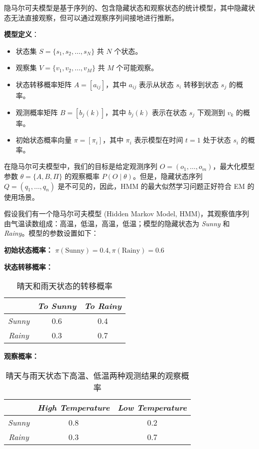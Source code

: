 \documentclass[12pt,a4paper]{article}%
\begin{document}
隐马尔可夫模型是基于序列的、包含隐藏状态和观察状态的统计模型，其中隐藏状态无法直接观察，但可以通过观察序列间接地进行推断。

\textbf{模型定义}：
\begin{itemize}
    \item 状态集 \( S = \{s_1, s_2, \ldots, s_N\} \) 共 \( N \) 个状态。
    \item 观察集 \( V = \{v_1, v_2, \ldots, v_M\} \) 共 \( M \) 个可能观察。
    \item 状态转移概率矩阵 \( A = [a_{ij}] \)，其中 \( a_{ij} \) 表示从状态 \( s_i \) 转移到状态 \( s_j \) 的概率。
    \item 观测概率矩阵 \( B = [b_j(k)] \)，其中 \( b_j(k) \) 表示在状态 \( s_j \) 下观测到 \( v_k \) 的概率。
    \item 初始状态概率向量 \( \pi = [\pi_i] \)，其中 \( \pi_i \) 表示模型在时间 \( t = 1 \) 处于状态 \( s_i \) 的概率。
\end{itemize}

在隐马尔可夫模型中，我们的目标是给定观测序列 \( O = (o_1, \dots, o_m) \)，最大化模型参数 $ \theta = \{A, B, \Pi\} $ 的观察概率 \( P(O \mid \theta) \)。但是，隐藏状态序列 \( Q = (q_1, \dots, q_n) \) 是不可见的，因此，HMM 的最大似然学习问题正好符合 EM 的使用场景。


假设我们有一个隐马尔可夫模型 (Hidden Markov Model, HMM)，其观察值序列由气温读数组成：高温，低温，高温，低温；模型的隐藏状态为 \textit{Sunny} 和 \textit{Rainy}。模型的参数设置如下：

\textbf{初始状态概率：} $\pi(\text{Sunny}) = 0.4,  \pi(\text{Rainy}) = 0.6$

\textbf{状态转移概率：}

\begin{table}[ht]
\centering
\begin{tabular}{@{}ccc@{}}
\toprule
& \textit{To Sunny} & \textit{To Rainy} \\
\midrule
\textit{Sunny} & 0.6 & 0.4 \\
\textit{Rainy} & 0.3 & 0.7 \\
\bottomrule
\end{tabular}
\caption{晴天和雨天状态的转移概率}
\label{tab:transition-prob}
\end{table}

\textbf{观察概率：}
\begin{table}[ht]
\begin{center}
    \begin{tabular}{@{}ccc@{}}
\toprule
& \textit{High Temperature} & \textit{Low Temperature} \\
\midrule
\textit{Sunny} & 0.8 & 0.2 \\
\textit{Rainy} & 0.3 & 0.7 \\
\bottomrule
\end{tabular}
\caption{晴天与雨天状态下高温、低温两种观测结果的观察概率}
\label{tab:emission-prob}
\end{center}
\end{table}
\end{document}
